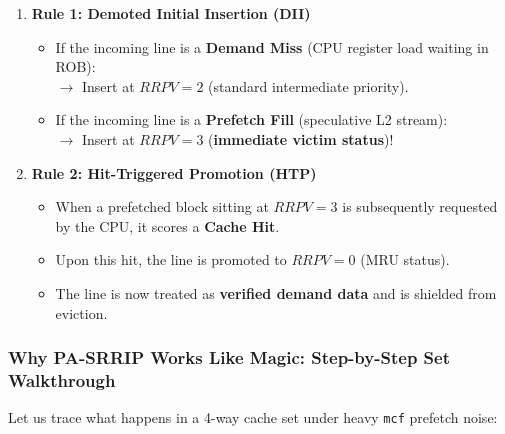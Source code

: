 \documentclass[11pt, a4paper]{article}
\begin{document}
\begin{defensebox}[title=\textbf{The Two Rules of PA-SRRIP}]
\begin{enumerate}[leftmargin=1.2em]
  \item \textbf{Rule 1: Demoted Initial Insertion (DII)}
  \begin{itemize}
    \item If the incoming line is a \textbf{Demand Miss} (CPU register load waiting in ROB):\\
    $\rightarrow$ Insert at \textbf{$RRPV = 2$} (standard intermediate priority).
    \item If the incoming line is a \textbf{Prefetch Fill} (speculative L2 stream):\\
    $\rightarrow$ Insert at \textbf{$RRPV = 3$} (\textbf{immediate victim status})!
  \end{itemize}

  \item \textbf{Rule 2: Hit-Triggered Promotion (HTP)}
  \begin{itemize}
    \item When a prefetched block sitting at $RRPV=3$ is subsequently requested by the CPU, it scores a \textbf{Cache Hit}.
    \item Upon this hit, the line is promoted to \textbf{$RRPV = 0$} (MRU status).
    \item The line is now treated as \textbf{verified demand data} and is shielded from eviction.
  \end{itemize}
\end{enumerate}
\end{defensebox}

\subsubsection{Why PA-SRRIP Works Like Magic: Step-by-Step Set Walkthrough}
Let us trace what happens in a 4-way cache set under heavy \texttt{mcf} prefetch noise:
\end{document}
